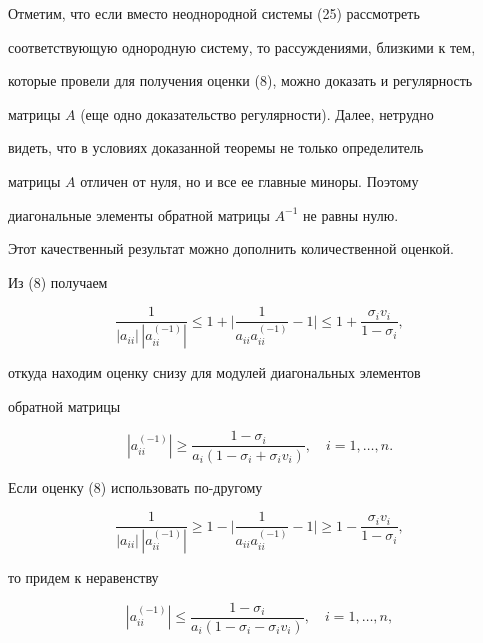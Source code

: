  


Отметим, что если вместо неоднородной системы (25) рассмотреть 


соответствующую однородную систему, то рассуждениями, близкими к тем, 


которые провели для получения оценки (8), можно доказать и регулярность  


матрицы $A$ (еще одно доказательство регулярности). Далее, нетрудно  


видеть, что в условиях доказанной теоремы не только определитель  


матрицы $A$ отличен от нуля, но и все ее главные миноры. Поэтому 


диагональные элементы обратной матрицы $A^{-1}$ не равны нулю. 


 


Этот качественный результат можно дополнить количественной оценкой.  


Из (8) получаем 


$$ 


\frac{1}{|a_{ii}|\,|a^{(-1)}_{ii}|}\le 1+ 


\bigg|\frac{1}{a_{ii}a^{(-1)}_{ii}}-1\bigg|\le 


1+\frac{\sigma_i v_i}{1-\sigma_i}, 


$$ 


откуда находим оценку снизу для модулей диагональных элементов  


обратной матрицы 


$$ 


|a^{(-1)}_{ii}|\ge\frac{1-\sigma_i} 


{a_i(1-\sigma_i+\sigma_i v_i)},\quad i=1,\dotsc,n. 


$$ 


Если оценку (8) использовать по-другому 


$$ 


\frac{1}{|a_{ii}|\,|a^{(-1)}_{ii}|}\ge 1-\bigg| 


\frac{1}{a_{ii}a^{(-1)}_{ii}}-1\bigg|\ge 1- 


\frac{\sigma_i v_i}{1-\sigma_i}, 


$$ 


то придем к неравенству 


$$ 


|a^{(-1)}_{ii}|\le\frac{1-\sigma_i} 


{a_i(1-\sigma_i-\sigma_i v_i)},\quad i=1,\dotsc,n, 


$$ 


